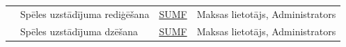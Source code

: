 \begin{tabularx}{\linewidth}{|p{2.1cm}|X|p{2.7cm}|X|}
	                                                           & Spēles uzstādījuma rediģēšana                          & \hyperref[tab:mod-func-setup-edit]{\stepcounter{rownum}SUMF\therownum}              & Maksas lietotājs, Administrators              \\ \cline{2-4}
	                                                           & Spēles uzstādījuma dzēšana                             & \hyperref[tab:mod-func-setup-delete]{\stepcounter{rownum}SUMF\therownum}            & Maksas lietotājs, Administrators              \\ \hline
\end{tabularx}

